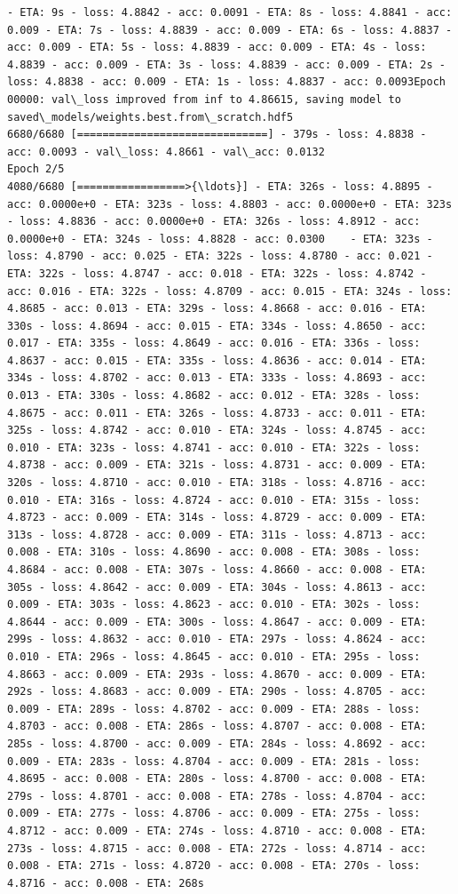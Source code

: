\documentclass[11pt]{article}
\begin{document}
\begin{Verbatim}[commandchars=\\\{\}]
- ETA: 9s - loss: 4.8842 - acc: 0.0091 - ETA: 8s - loss: 4.8841 - acc: 0.009 - ETA: 7s - loss: 4.8839 - acc: 0.009 - ETA: 6s - loss: 4.8837 - acc: 0.009 - ETA: 5s - loss: 4.8839 - acc: 0.009 - ETA: 4s - loss: 4.8839 - acc: 0.009 - ETA: 3s - loss: 4.8839 - acc: 0.009 - ETA: 2s - loss: 4.8838 - acc: 0.009 - ETA: 1s - loss: 4.8837 - acc: 0.0093Epoch 00000: val\_loss improved from inf to 4.86615, saving model to saved\_models/weights.best.from\_scratch.hdf5
6680/6680 [==============================] - 379s - loss: 4.8838 - acc: 0.0093 - val\_loss: 4.8661 - val\_acc: 0.0132
Epoch 2/5
4080/6680 [=================>{\ldots}] - ETA: 326s - loss: 4.8895 - acc: 0.0000e+0 - ETA: 323s - loss: 4.8803 - acc: 0.0000e+0 - ETA: 323s - loss: 4.8836 - acc: 0.0000e+0 - ETA: 326s - loss: 4.8912 - acc: 0.0000e+0 - ETA: 324s - loss: 4.8828 - acc: 0.0300    - ETA: 323s - loss: 4.8790 - acc: 0.025 - ETA: 322s - loss: 4.8780 - acc: 0.021 - ETA: 322s - loss: 4.8747 - acc: 0.018 - ETA: 322s - loss: 4.8742 - acc: 0.016 - ETA: 322s - loss: 4.8709 - acc: 0.015 - ETA: 324s - loss: 4.8685 - acc: 0.013 - ETA: 329s - loss: 4.8668 - acc: 0.016 - ETA: 330s - loss: 4.8694 - acc: 0.015 - ETA: 334s - loss: 4.8650 - acc: 0.017 - ETA: 335s - loss: 4.8649 - acc: 0.016 - ETA: 336s - loss: 4.8637 - acc: 0.015 - ETA: 335s - loss: 4.8636 - acc: 0.014 - ETA: 334s - loss: 4.8702 - acc: 0.013 - ETA: 333s - loss: 4.8693 - acc: 0.013 - ETA: 330s - loss: 4.8682 - acc: 0.012 - ETA: 328s - loss: 4.8675 - acc: 0.011 - ETA: 326s - loss: 4.8733 - acc: 0.011 - ETA: 325s - loss: 4.8742 - acc: 0.010 - ETA: 324s - loss: 4.8745 - acc: 0.010 - ETA: 323s - loss: 4.8741 - acc: 0.010 - ETA: 322s - loss: 4.8738 - acc: 0.009 - ETA: 321s - loss: 4.8731 - acc: 0.009 - ETA: 320s - loss: 4.8710 - acc: 0.010 - ETA: 318s - loss: 4.8716 - acc: 0.010 - ETA: 316s - loss: 4.8724 - acc: 0.010 - ETA: 315s - loss: 4.8723 - acc: 0.009 - ETA: 314s - loss: 4.8729 - acc: 0.009 - ETA: 313s - loss: 4.8728 - acc: 0.009 - ETA: 311s - loss: 4.8713 - acc: 0.008 - ETA: 310s - loss: 4.8690 - acc: 0.008 - ETA: 308s - loss: 4.8684 - acc: 0.008 - ETA: 307s - loss: 4.8660 - acc: 0.008 - ETA: 305s - loss: 4.8642 - acc: 0.009 - ETA: 304s - loss: 4.8613 - acc: 0.009 - ETA: 303s - loss: 4.8623 - acc: 0.010 - ETA: 302s - loss: 4.8644 - acc: 0.009 - ETA: 300s - loss: 4.8647 - acc: 0.009 - ETA: 299s - loss: 4.8632 - acc: 0.010 - ETA: 297s - loss: 4.8624 - acc: 0.010 - ETA: 296s - loss: 4.8645 - acc: 0.010 - ETA: 295s - loss: 4.8663 - acc: 0.009 - ETA: 293s - loss: 4.8670 - acc: 0.009 - ETA: 292s - loss: 4.8683 - acc: 0.009 - ETA: 290s - loss: 4.8705 - acc: 0.009 - ETA: 289s - loss: 4.8702 - acc: 0.009 - ETA: 288s - loss: 4.8703 - acc: 0.008 - ETA: 286s - loss: 4.8707 - acc: 0.008 - ETA: 285s - loss: 4.8700 - acc: 0.009 - ETA: 284s - loss: 4.8692 - acc: 0.009 - ETA: 283s - loss: 4.8704 - acc: 0.009 - ETA: 281s - loss: 4.8695 - acc: 0.008 - ETA: 280s - loss: 4.8700 - acc: 0.008 - ETA: 279s - loss: 4.8701 - acc: 0.008 - ETA: 278s - loss: 4.8704 - acc: 0.009 - ETA: 277s - loss: 4.8706 - acc: 0.009 - ETA: 275s - loss: 4.8712 - acc: 0.009 - ETA: 274s - loss: 4.8710 - acc: 0.008 - ETA: 273s - loss: 4.8715 - acc: 0.008 - ETA: 272s - loss: 4.8714 - acc: 0.008 - ETA: 271s - loss: 4.8720 - acc: 0.008 - ETA: 270s - loss: 4.8716 - acc: 0.008 - ETA: 268s 
\end{Verbatim}
\end{document}
